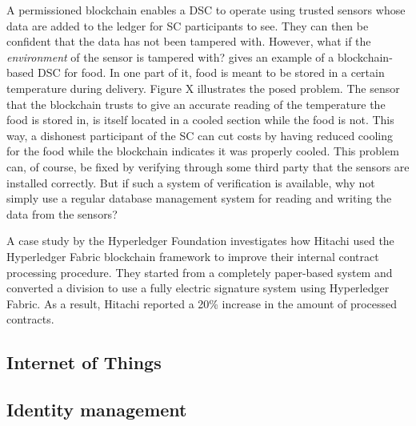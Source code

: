 A permissioned blockchain enables a DSC to operate using trusted
sensors whose data are added to the ledger for SC participants to see.
They can then be confident that the data has not been tampered with.
However, what if the \textit{environment} of the sensor is tampered
with? \cite{wustBlockchainNeed} gives an example of a blockchain-based
DSC for food. In one part of it, food is meant to be stored in a
certain temperature during delivery. Figure X illustrates the posed
problem. The sensor that the blockchain trusts to give an accurate
reading of the temperature the food is stored in, is itself located in
a cooled section while the food is not. This way, a dishonest
participant of the SC can cut costs by having reduced cooling for the
food while the blockchain indicates it was properly cooled. This
problem can, of course, be fixed by verifying through some third party
that the sensors are installed correctly. But if such a system of
verification is available, why not simply use a regular database
management system for reading and writing the data from the sensors?


A case study by the Hyperledger Foundation \cite{hyperledgerHitachi}
investigates how Hitachi used the Hyperledger Fabric blockchain framework
to improve their internal contract processing procedure. They started
from a completely paper-based system and converted a division to use
a fully electric signature system using Hyperledger Fabric. As a result,
Hitachi reported a 20\% increase in the amount of processed contracts.



\subsection{Internet of Things}

\subsection{Identity management}

\subsection{}
